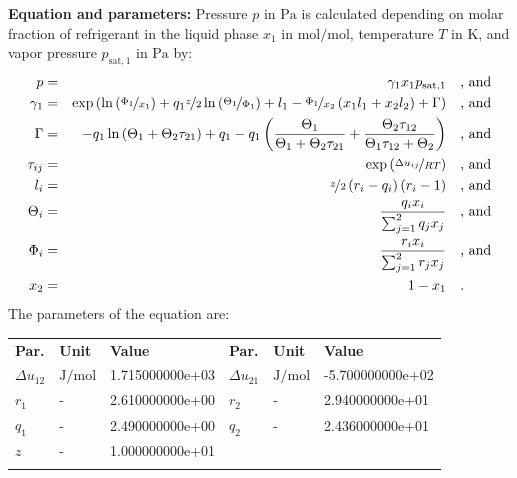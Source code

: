 \textbf{Equation and parameters:}
\newline
%
Pressure $p$ in $\si{\pascal}$ is calculated depending on molar fraction of refrigerant in the liquid phase $x_1$ in $\si{\mole\per\mole}$, temperature $T$ in $\si{\kelvin}$, and vapor pressure $p_\mathrm{sat,1}$ in $\si{\pascal}$ by:
%
\begin{equation*}
\begin{split}
p &=& \gamma_1 x_1 p_\mathrm{sat,1} & \quad\text{, and} \\
\gamma_1 &=& \exp \left( \ln \left( \nicefrac{\Phi_1}{x_1} \right) + q_1 \nicefrac{z}{2} \ln \left( \nicefrac{\Theta_1}{\Phi_1} \right) + l_1 - \nicefrac{\Phi_1}{x_2} \left( x_1 l_1 + x_2 l_2 \right) + \Gamma \right) & \quad\text{, and} \\
\Gamma &=& - q_1 \ln \left( \Theta_1 + \Theta_2 \tau_{21} \right) + q_1 - q_1 \left( \frac{\Theta_1}{\Theta_1 + \Theta_2 \tau_{21}} + \frac{\Theta_2 \tau_{12}}{\Theta_1 \tau_{12} + \Theta_2} \right) & \quad\text{, and} \\
\tau_{ij} &=& \exp \left( \nicefrac{\Delta u_{ij}}{R T} \right) & \quad\text{, and} \\
l_i &=& \nicefrac{z}{2} \left( r_i - q_i \right) \left(r_i - 1 \right) & \quad\text{, and} \\
\Theta_i &=& \frac{q_i x_i}{\sum_{j=1}^{2} q_j x_j} & \quad\text{, and} \\
\Phi_i &=& \frac{r_i x_i}{\sum_{j=1}^{2} r_j x_j} & \quad\text{, and} \\
x_2 &=& 1 - x_1  & \quad\text{.} \\
\end{split}
\end{equation*}
%
The parameters of the equation are:
%
\begin{longtable}[l]{lll|lll}
\toprule
\addlinespace
\textbf{Par.} & \textbf{Unit} & \textbf{Value} &	\textbf{Par.} & \textbf{Unit} & \textbf{Value} \\
\addlinespace
\midrule
\endhead

\bottomrule
\endfoot
\bottomrule
\endlastfoot
\addlinespace

$\Delta u_{12}$ & $\si{\joule\per\mole}$ & 1.715000000e+03 & $\Delta u_{21}$ & $\si{\joule\per\mole}$ & -5.700000000e+02 \\
$r_{1}$ & - & 2.610000000e+00 & $r_{2}$ & - & 2.940000000e+01 \\
$q_{1}$ & - & 2.490000000e+00 & $q_{2}$ & - & 2.436000000e+01 \\
$z$ & - & 1.000000000e+01 & & &  \\

\addlinespace\end{longtable}

